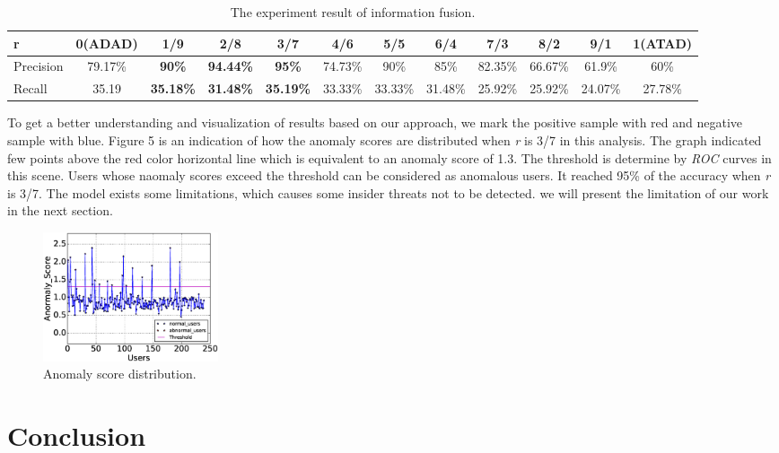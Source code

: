 \documentclass[conference]{IEEEtran}
\begin{document}
\begin{table}[tbp]
\caption{The experiment result of information fusion.}
\centering  %
\begin{tabular}{lccccccccccc}  %
\hline
r &0(ADAD)&\textbf{1/9} &\textbf{2/8} &\textbf{3/7} &4/6 &5/5 &6/4 &7/3 &8/2 &9/1 &1(ATAD)\\\hline

Precision &79.17\% &\textbf{90\%} &\textbf{94.44\%} &\textbf{95\%}&74.73\%&90\%  &85\% &82.35\% &66.67\%&61.9\%&60\% \\\hline

Recall &35.19 &\textbf{35.18\%} &\textbf{31.48\%} &\textbf{35.19\%}&33.33\%&33.33\%&31.48\%&25.92\%&25.92\%&24.07\%&27.78\%\\\hline
\end{tabular}

\end{table}

To get a better understanding and visualization of results based on our approach, we mark the positive sample with red and negative sample with blue. Figure 5 is an indication of how the anomaly scores are distributed when \emph{r} is 3/7 in this analysis. The graph indicated few points above the red color horizontal line which is equivalent to an anomaly score of 1.3. The threshold is determine by \emph{ROC} curves in this scene. Users whose naomaly scores exceed the threshold can be considered as anomalous users. It reached 95\% of the accuracy when \emph{r} is 3/7. The model exists some limitations, which causes some insider threats not to be detected. 
we will present the limitation of our work in the next section.

\begin{figure}[htb]
\centerline{\includegraphics[width = 0.25\textwidth]{figure/figure8.eps}}
\caption{Anomaly score distribution.}
\label{fig}
\end{figure}

\section{Conclusion}
\end{document}
